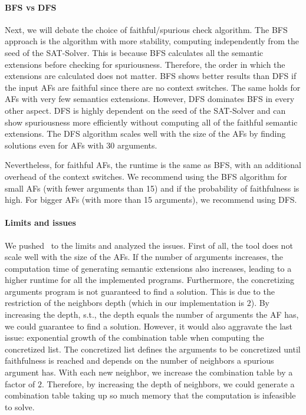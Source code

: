 \paragraph{BFS vs DFS} Next, we will debate the choice of faithful/spurious check algorithm. The BFS approach is the algorithm with more stability, computing independently from the seed of the SAT-Solver. This is because BFS calculates all the semantic extensions before checking for spuriousness. Therefore, the order in which the extensions are calculated does not matter. BFS shows better results than DFS if the input AFs are faithful since there are no context switches. The same holds for AFs with very few semantics extensions. However, DFS dominates BFS in every other aspect. DFS is highly dependent on the seed of the SAT-Solver and can show spuriousness more efficiently without computing all of the faithful semantic extensions. The DFS algorithm scales well with the size of the AFs by finding solutions even for AFs with 30 arguments.

Nevertheless, for faithful AFs, the runtime is the same as BFS, with an additional overhead of the context switches. We recommend using the BFS algorithm for small AFs (with fewer arguments than 15) and if the probability of faithfulness is high. For bigger AFs (with more than 15 arguments), we recommend using DFS.

\paragraph{Limits and issues} We pushed \prog\ to the limits and analyzed the issues. First of all, the tool does not scale well with the size of the AFs. If the number of arguments increases, the computation time of generating semantic extensions also increases, leading to a higher runtime for all the implemented programs. Furthermore, the concretizing arguments program is not guaranteed to find a solution. This is due to the restriction of the neighbors depth (which in our implementation is $2$). By increasing the depth, s.t., the depth equals the number of arguments the AF has, we could guarantee to find a solution. However, it would also aggravate the last issue: exponential growth of the combination table when computing the concretized list. The concretized list defines the arguments to be concretized until faithfulness is reached and depends on the number of neighbors a spurious argument has. With each new neighbor, we increase the combination table by a factor of $2$. Therefore, by increasing the depth of neighbors, we could generate a combination table taking up so much memory that the computation is infeasible to solve.


